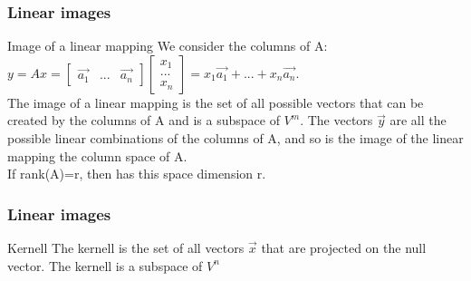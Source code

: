 \begin{frame}
	\frametitle{Linear images}
	\begin{block}{Image of a linear mapping}
		We consider the columns of A: $y=Ax=\begin{bmatrix}
		\overrightarrow{a_1} & ... & \overrightarrow{a_n}
		\end{bmatrix}\begin{bmatrix}
		x_1\\...\\x_n
		\end{bmatrix}=x_1\overrightarrow{a_1}+...+x_n\overrightarrow{a_n}$.\\
		The image of a linear mapping is the set of all possible vectors that can be created by the columns of A and is a subspace of $V^m$. The vectors $\overrightarrow{y}$ are all the possible linear combinations of the columns of A, and so is the image of the linear mapping the column space of A. \\
		If rank(A)=r, then has this space dimension r.
	\end{block}
\end{frame}

\begin{frame}
	\frametitle{Linear images}
	\begin{block}{Kernell}
		The kernell is the set of all vectors $\overrightarrow{x}$ that are projected on the null vector. The kernell is a subspace of $V^n$
	\end{block}
\end{frame}